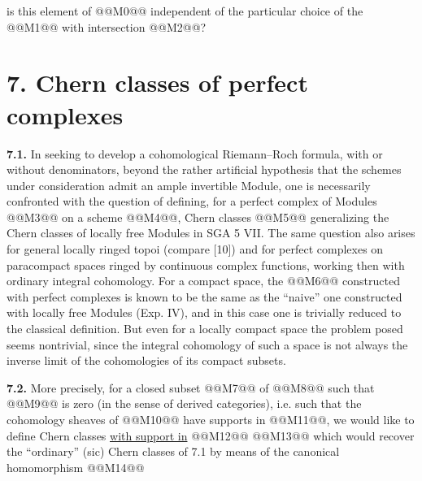 is this element of @@M0@@ independent of the particular choice of the @@M1@@ with intersection @@M2@@?

\section*{7. Chern classes of perfect complexes}

\textbf{7.1.} In seeking to develop a cohomological Riemann--Roch formula, with or without denominators, beyond the rather artificial hypothesis that the schemes under consideration admit an ample invertible Module, one is necessarily confronted with the question of defining, for a perfect complex of Modules @@M3@@ on a scheme @@M4@@, Chern classes
@@M5@@
generalizing the Chern classes of locally free Modules in SGA 5 VII. The same question also arises for general locally ringed topoi (compare [10]) and for perfect complexes on paracompact spaces ringed by continuous complex functions, working then with ordinary integral cohomology. For a compact space, the @@M6@@ constructed with perfect complexes is known to be the same as the ``naive'' one constructed with locally free Modules (Exp. IV), and in this case one is trivially reduced to the classical definition. But even for a locally compact space the problem posed seems nontrivial, since the integral cohomology of such a space is not always the inverse limit of the cohomologies of its compact subsets.

\textbf{7.2.} More precisely, for a closed subset @@M7@@ of @@M8@@ such that @@M9@@ is zero (in the sense of derived categories), i.e. such that the cohomology sheaves of @@M10@@ have supports in @@M11@@, we would like to define Chern classes \uline{with support in} @@M12@@
@@M13@@
which would recover the ``ordinary'' (sic) Chern classes of 7.1 by means of the canonical homomorphism
@@M14@@
